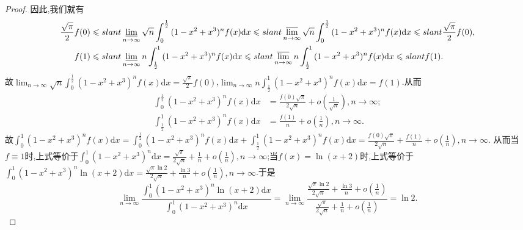 \documentclass[../../main.tex]{subfiles}
\begin{document}
\begin{proof}
因此,我们就有
\begin{align*}
\frac{\sqrt{\pi}}{2}f(0)&\leqslant slant \varliminf_{n\rightarrow\infty}\sqrt{n}\int_0^{\frac{1}{2}}{(1 - x^2 + x^3)^nf(x)\mathrm{d}x}\leqslant slant \varlimsup_{n\rightarrow\infty}\sqrt{n}\int_0^{\frac{1}{2}}{(1 - x^2 + x^3)^nf(x)\mathrm{d}x}\leqslant slant \frac{\sqrt{\pi}}{2}f(0),\\
f(1)&\leqslant slant \varliminf_{n\rightarrow\infty}n\int_{\frac{1}{2}}^1{(1 - x^2 + x^3)^nf(x)\mathrm{d}x}\leqslant slant \varlimsup_{n\rightarrow\infty}n\int_{\frac{1}{2}}^1{(1 - x^2 + x^3)^nf(x)\mathrm{d}x}\leqslant slant f(1).
\end{align*}
故\(\lim_{n\rightarrow\infty}\sqrt{n}\int_0^{\frac{1}{2}}{(1 - x^2 + x^3)^nf(x)\mathrm{d}x}=\frac{\sqrt{\pi}}{2}f(0)\),\(\lim_{n\rightarrow\infty}n\int_{\frac{1}{2}}^1{(1 - x^2 + x^3)^nf(x)\mathrm{d}x}=f(1)\).从而
\begin{align*}
\int_0^{\frac{1}{2}}{(1 - x^2 + x^3)^nf(x)\mathrm{d}x}&=\frac{f(0)\sqrt{\pi}}{2\sqrt{n}}+o\left(\frac{1}{\sqrt{n}}\right),  n\rightarrow\infty;\\
\int_{\frac{1}{2}}^1{(1 - x^2 + x^3)^nf(x)\mathrm{d}x}&=\frac{f(1)}{n}+o\left(\frac{1}{n}\right),  n\rightarrow\infty.
\end{align*}
故\(\int_0^1{(1 - x^2 + x^3)^nf(x)\mathrm{d}x}=\int_0^{\frac{1}{2}}{(1 - x^2 + x^3)^nf(x)\mathrm{d}x}+\int_{\frac{1}{2}}^1{(1 - x^2 + x^3)^nf(x)\mathrm{d}x}=\frac{f(0)\sqrt{\pi}}{2\sqrt{n}}+\frac{f(1)}{n}+o\left(\frac{1}{n}\right),  n\rightarrow\infty\).
从而当\(f\equiv 1\)时,上式等价于\(\int_0^1{(1 - x^2 + x^3)^n\mathrm{d}x}=\frac{\sqrt{\pi}}{2\sqrt{n}}+\frac{1}{n}+o\left(\frac{1}{n}\right),  n\rightarrow\infty\);当\(f(x) = \ln(x + 2)\)时,上式等价于\(\int_0^1{(1 - x^2 + x^3)^n\ln(x + 2)\mathrm{d}x}=\frac{\sqrt{\pi}\ln 2}{2\sqrt{n}}+\frac{\ln 3}{n}+o\left(\frac{1}{n}\right),  n\rightarrow\infty\).于是
\[
\lim_{n\rightarrow\infty}\frac{\int_0^1{(1 - x^2 + x^3)^n\ln(x + 2)\mathrm{d}x}}{\int_0^1{(1 - x^2 + x^3)^n\mathrm{d}x}}=\lim_{n\rightarrow\infty}\frac{\frac{\sqrt{\pi}\ln 2}{2\sqrt{n}}+\frac{\ln 3}{n}+o\left(\frac{1}{n}\right)}{\frac{\sqrt{\pi}}{2\sqrt{n}}+\frac{1}{n}+o\left(\frac{1}{n}\right)}=\ln 2.
\]
\end{proof}
\end{document}
